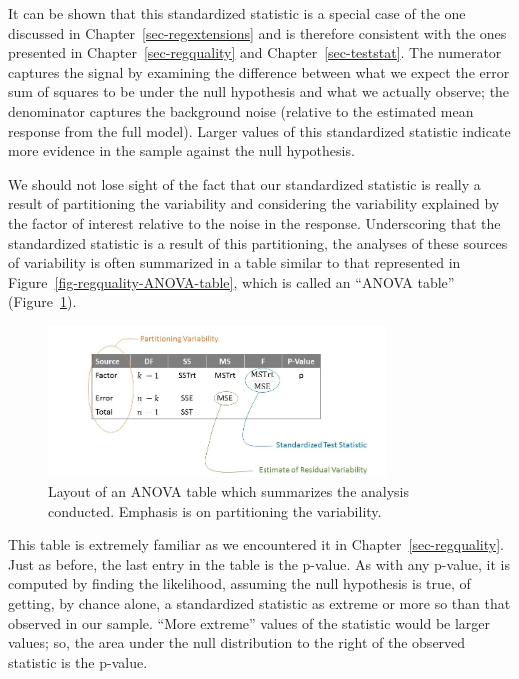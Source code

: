 \documentclass[
  letterpaper,
  DIV=11,
  numbers=noendperiod]{scrreprt}
\theoremstyle{definition}
\theoremstyle{definition}
\theoremstyle{plain}
\theoremstyle{remark}
\begin{document}
It can be shown that this standardized statistic is a special case of
the one discussed in Chapter~\ref{sec-regextensions} and is therefore
consistent with the ones presented in Chapter~\ref{sec-regquality} and
Chapter~\ref{sec-teststat}. The numerator captures the signal by
examining the difference between what we expect the error sum of squares
to be under the null hypothesis and what we actually observe; the
denominator captures the background noise (relative to the estimated
mean response from the full model). Larger values of this standardized
statistic indicate more evidence in the sample against the null
hypothesis.

We should not lose sight of the fact that our standardized statistic is
really a result of partitioning the variability and considering the
variability explained by the factor of interest relative to the noise in
the response. Underscoring that the standardized statistic is a result
of this partitioning, the analyses of these sources of variability is
often summarized in a table similar to that represented in
Figure~\ref{fig-regquality-ANOVA-table}, which is called an ``ANOVA
table'' (Figure~\ref{fig-anovateststat-anova-table}).

\begin{figure}

{\centering \includegraphics[width=0.8\textwidth,height=\textheight]{./images/ANOVAteststat-Table.jpg}

}

\caption{\label{fig-anovateststat-anova-table}Layout of an ANOVA table
which summarizes the analysis conducted. Emphasis is on partitioning the
variability.}

\end{figure}

This table is extremely familiar as we encountered it in
Chapter~\ref{sec-regquality}. Just as before, the last entry in the
table is the p-value. As with any p-value, it is computed by finding the
likelihood, assuming the null hypothesis is true, of getting, by chance
alone, a standardized statistic as extreme or more so than that observed
in our sample. ``More extreme'' values of the statistic would be larger
values; so, the area under the null distribution to the right of the
observed statistic is the p-value.
\end{document}
